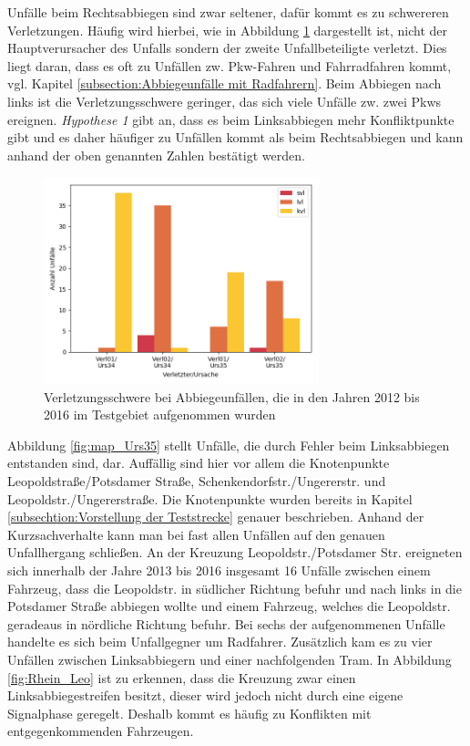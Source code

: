 Unfälle beim Rechtsabbiegen sind zwar seltener, dafür kommt es zu schwereren Verletzungen. Häufig wird hierbei, wie in Abbildung \ref{fig:Abbiegen_Verletzungen} dargestellt ist, nicht der Hauptverursacher des Unfalls sondern der zweite Unfallbeteiligte verletzt. Dies liegt daran, dass es oft zu Unfällen zw. Pkw-Fahren und Fahrradfahren kommt, vgl. Kapitel \ref{subsection:Abbiegeunfälle mit Radfahrern}. Beim Abbiegen nach links ist die Verletzungsschwere geringer, das sich viele Unfälle zw. zwei Pkws ereignen. \textit{Hypothese 1} gibt an, dass es beim Linksabbiegen mehr Konfliktpunkte gibt und es daher häufiger zu Unfällen kommt als beim Rechtsabbiegen und kann anhand der oben genannten Zahlen bestätigt werden.

\begin{savenotes}
	\begin{figure}[H]
		\centering
		\includegraphics[width=8cm,height=6cm]{figures/Abbiegen_Verletzung}
		\caption[Verletzungsschwere der Unfallbeteiligten bei Abbiegeunfällen, die in den Jahren 2012 bis 2016 im Testgebiet aufgenommen wurden]{Verletzungsschwere bei Abbiegeunfällen, die in den Jahren 2012 bis 2016 im Testgebiet aufgenommen wurden}\label{fig:Abbiegen_Verletzungen}
	\end{figure}
\end{savenotes}

Abbildung \ref{fig:map_Urs35} stellt Unfälle, die durch Fehler beim Linksabbiegen entstanden sind, dar. Auffällig sind hier vor allem die Knotenpunkte Leopoldstraße/Potsdamer Straße, Schenkendorfstr./Ungererstr. und Leopoldstr./Ungererstraße. Die Knotenpunkte wurden bereits in Kapitel \ref{subsechtion:Vorstellung der Teststrecke} genauer beschrieben. Anhand der Kurzsachverhalte kann man bei fast allen Unfällen auf den genauen Unfallhergang schließen. An der Kreuzung Leopoldstr./Potsdamer Str. ereigneten sich innerhalb der Jahre 2013 bis 2016 insgesamt 16 Unfälle zwischen einem Fahrzeug, dass die Leopoldstr. in südlicher Richtung befuhr und nach links in die Potsdamer Straße abbiegen wollte und einem Fahrzeug, welches die Leopoldstr. geradeaus in nördliche Richtung befuhr. Bei sechs der aufgenommenen Unfälle handelte es sich beim Unfallgegner um Radfahrer. Zusätzlich kam es zu vier Unfällen zwischen Linksabbiegern und einer nachfolgenden Tram. In Abbildung \ref{fig:Rhein_Leo} ist zu erkennen, dass die Kreuzung zwar einen Linksabbiegestreifen besitzt, dieser wird jedoch nicht durch eine eigene Signalphase geregelt. Deshalb kommt es häufig zu Konflikten mit entgegenkommenden Fahrzeugen.

